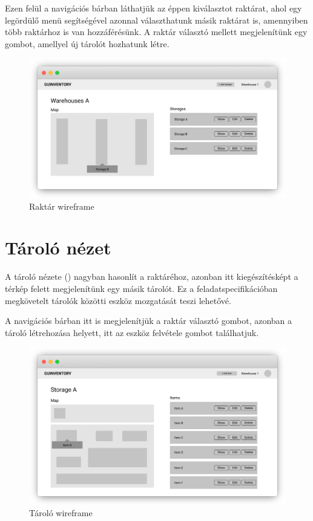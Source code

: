 Ezen felül a navigációs bárban láthatjük az éppen kiválasztot raktárat, ahol egy legördülő menü segítségével azonnal választhatunk másik raktárat is, amennyiben több raktárhoz is van hozzáférésünk.
A raktár választó mellett megjelenítünk egy gombot, amellyel új tárolót hozhatunk létre.
\begin{figure}[!ht]
  \centering
  \includegraphics[width=150mm, keepaspectratio]{figures/wireframes/frame_warehouse.png}
  \caption{Raktár wireframe}
  \label{fig:WarehouseWireframe}
\end{figure}

\section{Tároló nézet}
A tároló nézete () nagyban hasonlít a raktáréhoz, azonban itt kiegészítésképt a térkép felett megjelenítünk egy másik tárolót.
Ez a feladatspecifikációban megkövetelt tárolók közötti eszköz mozgatását teszi lehetővé.

A navigációs bárban itt is megjelenítjük a raktár választó gombot, azonban a tároló létrehozása helyett, itt az eszköz felvétele gombot találhatjuk.

\begin{figure}[!ht]
  \centering
  \includegraphics[width=150mm, keepaspectratio]{figures/wireframes/frame_storage.png}
  \caption{Tároló wireframe}
  \label{fig:StorageWireframe}
\end{figure}
  